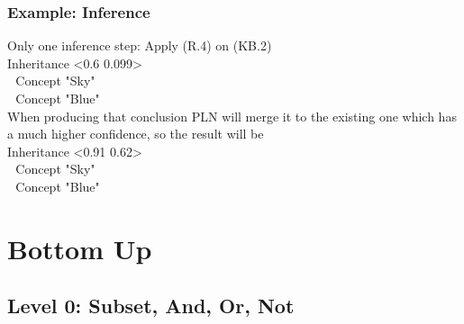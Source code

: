 \documentclass{beamer}
\begin{document}
\frame
{
  \frametitle{Example: Inference}

  {\small
    Only one inference step: \alert{Apply} (R.4) on (KB.2)\\[.2cm]
    Inheritance <0.6 0.099>\\
    $\ \ \ $Concept "Sky"\\
    $\ \ \ $Concept "Blue"\\[.5cm]
    
    When producing that conclusion PLN will \alert{merge} it
    to the existing one which has a much higher confidence, so the
    result will be\\[.2cm]
    Inheritance <0.91 0.62>\\
    $\ \ \ $Concept "Sky"\\
    $\ \ \ $Concept "Blue"\\[.5cm]
  }
}

\section{Bottom Up}

\subsection{Level 0: Subset, And, Or, Not}
\end{document}
